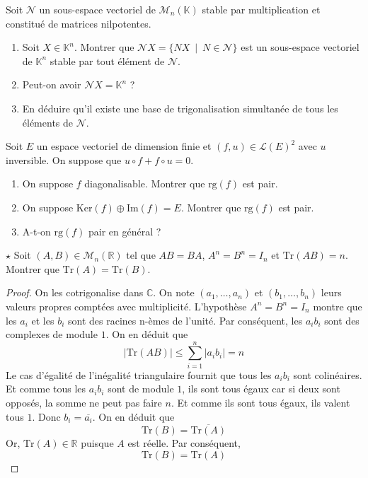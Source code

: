 \documentclass[french,a4paper]{article}
\newcommand{\R}{\mathbb{R}}
\newcommand{\C}{\mathbb{C}}
\newcommand{\K}{\mathbb{K}}
\renewcommand{\ker}{\text{Ker}}
\newcommand{\Tr}{\text{Tr}}
\theoremstyle{plain}
\theoremstyle{definition}
\theoremstyle{remark}
\begin{document}
\begin{ex}{}
	Soit $\mathcal{N}$ un sous-espace vectoriel de $\mathcal{M}_n(\K)$ stable par multiplication et constitué de matrices nilpotentes.
	\begin{enumerate}
		\item Soit $X\in\K^n$. Montrer que $\mathcal{N}X=\{NX\ \mid\ N\in\mathcal{N}\}$ est un sous-espace vectoriel de $\K^n$ stable par tout élément de $\mathcal{N}$.
		\item Peut-on avoir $\mathcal{N}X=\K^n$ ?
		\item En déduire qu'il existe une base de trigonalisation simultanée de tous les éléments de $\mathcal{N}$.
	\end{enumerate}
\end{ex}

\begin{ex}{}
	Soit $E$ un espace vectoriel de dimension finie et $(f,u)\in\mathcal{L}(E)^2$ avec $u$ inversible. On suppose que $u\circ f+f\circ u=0$.
	\begin{enumerate}
		\item On suppose $f$ diagonalisable. Montrer que $\text{rg}(f)$ est pair.
		\item On suppose $\ker(f)\oplus\text{Im}(f)=E$. Montrer que $\text{rg}(f)$ est pair.
		\item A-t-on $\text{rg}(f)$ pair en général ?
	\end{enumerate}
\end{ex}

\begin{ex}{$\star$}
	Soit $(A,B)\in\mathcal{M}_n(\R)$ tel que $AB=BA$, $A^n=B^n=I_n$ et $\Tr(AB)=n$. Montrer que $\Tr(A)=\Tr(B)$.
\end{ex}
\begin{proof}
	On les cotrigonalise dans $\C$. On note $(a_1,\ldots,a_n)$ et $(b_1,\ldots,b_n)$ leurs valeurs propres comptées avec multiplicité. L'hypothèse $A^n=B^n=I_n$ montre que les $a_i$ et les $b_i$ sont des racines n-èmes de l'unité. Par conséquent, les $a_ib_i$ sont des complexes de module $1$. On en déduit que $$\lvert\Tr(AB)\rvert\leqslant\sum_{i=1}^{n}\lvert a_ib_i\rvert=n$$ Le cas d'égalité de l'inégalité triangulaire fournit que tous les $a_ib_i$ sont colinéaires. Et comme tous les $a_i b_i$ sont de module $1$, ils sont tous égaux car si deux sont opposés, la somme ne peut pas faire $n$. Et comme ils sont tous égaux, ils valent tous $1$. Donc $b_i=\overline{a_i}$. On en déduit que $$\Tr(B)=\overline{\Tr(A)}$$ Or, $\Tr(A)\in\R$ puisque $A$ est réelle. Par conséquent, $$\Tr(B)=\Tr(A)$$
\end{proof}
\end{document}
